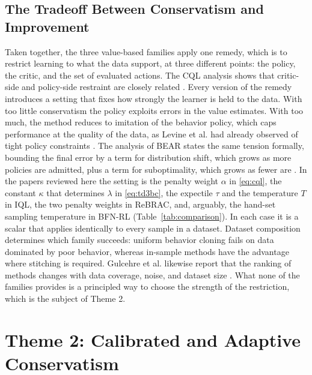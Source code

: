 \documentclass[conference]{IEEEtran}
\begin{document}
\subsection{The Tradeoff Between Conservatism and Improvement}
Taken together, the three value-based families apply one remedy, which is to restrict learning to what the data support, at three different points: the policy, the critic, and the set of evaluated actions. The CQL analysis shows that critic-side and policy-side restraint are closely related \cite{kumar2020cql}. Every version of the remedy introduces a setting that fixes how strongly the learner is held to the data. With too little conservatism the policy exploits errors in the value estimates. With too much, the method reduces to imitation of the behavior policy, which caps performance at the quality of the data, as Levine et al. had already observed of tight policy constraints \cite{levine2020tutorial}. The analysis of BEAR states the same tension formally, bounding the final error by a term for distribution shift, which grows as more policies are admitted, plus a term for suboptimality, which grows as fewer are \cite{kumar2019bear}. In the papers reviewed here the setting is the penalty weight $\alpha$ in \eqref{eq:cql}, the constant $\kappa$ that determines $\lambda$ in \eqref{eq:td3bc}, the expectile $\tau$ and the temperature $T$ in IQL, the two penalty weights in ReBRAC, and, arguably, the hand-set sampling temperature in BFN-RL (Table~\ref{tab:comparison}). In each case it is a scalar that applies identically to every sample in a dataset. Dataset composition determines which family succeeds: uniform behavior cloning fails on data dominated by poor behavior, whereas in-sample methods have the advantage where stitching is required. Gulcehre et al. likewise report that the ranking of methods changes with data coverage, noise, and dataset size \cite{gulcehre2020brr}. What none of the families provides is a principled way to choose the strength of the restriction, which is the subject of Theme 2.

\section{Theme 2: Calibrated and Adaptive Conservatism}
\label{sec:theme2}
\end{document}
